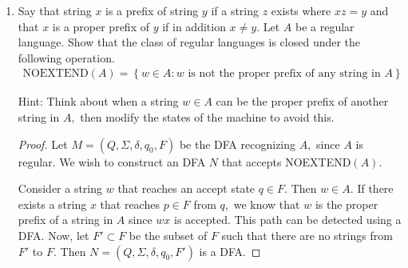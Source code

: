 \documentclass{article}
\begin{document}
\begin{enumerate}
		Show that, any DFA that recognizes the same language must have at least $2^k$ states.

		Hint: start by looking at the following two strings: $10^{k-1}$ and $0^k.$ Observe that when a DFA takes them as inputs, it must end up at different states, since one string is accepted and the other is rejected.
		\begin{proof}
			Fix $k$ and consider two strings $a=a_1a_2\cdots a_k$ and $b=b_1b_2\cdots b_k$ of length $k$ that are different. Then there must exist an index $i$ where they differ. WLOG $a_i=1$ and $b_i=0.$ Now let $c=0^{i-1}.$ Then $ac$ is a string where the $k$th position from the end is a 1, and $bc$ is a string where the $k$th position from the end is a 0. Thus, $ac$ would be accepted while $bc$ is not, so these strings must be different states.

			Thus, for any two strings of length $k,$ there must be two distinct states in the DFA to account for the above process. Since there are $2^k$ strings of length $k,$ there must be at least $2^k$ distinct states in the DFA.
		\end{proof}

		\newpage
	\item Say that string $x$ is a prefix of string $y$ if a string $z$ exists where $xz=y$ and that $x$ is a proper prefix of $y$ if in addition $x\neq y.$ Let $A$ be a regular language. Show that the class of regular languages is closed under the following operation.
		\begin{align*}
			\text{NOEXTEND}(A) = \left\{ w\in A:w\text{ is not the proper prefix of any string in }A \right\}
		\end{align*}

		Hint: Think about when a string $w\in A$ can be the proper prefix of another string in $A,$ then modify the states of the machine to avoid this.
		\begin{proof}
			Let $M=(Q, \Sigma, \delta, q_0, F)$ be the DFA recognizing $A,$ since $A$ is regular. We wish to construct an DFA $N$ that accepts NOEXTEND$(A).$ 

			Consider a string $w$ that reaches an accept state $q\in F.$ Then $w\in A.$ If there exists a string $x$ that reaches $p\in F$ from $q,$ we know that $w$ is the proper prefix of a string in $A$ since $wx$ is accepted. This path can be detected using a DFA. Now, let $F'\subset F$ be the subset of $F$ such that there are no strings from $F'$ to $F.$ Then $N=(Q, \Sigma, \delta, q_0, F')$ is a DFA.


\end{proof}
\end{enumerate}
\end{document}
